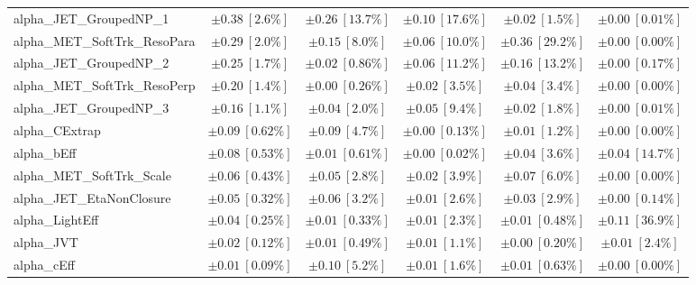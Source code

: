 \begin{sidewaystable}
\begin{center}
\begin{tabular*}{\textwidth}{@{\extracolsep{\fill}}lccccc}
alpha\_JET\_GroupedNP\_1         & $\pm 0.38\ [2.6\%] $          & $\pm 0.26\ [13.7\%] $          & $\pm 0.10\ [17.6\%] $          & $\pm 0.02\ [1.5\%] $          & $\pm 0.00\ [0.01\%] $       \\
alpha\_MET\_SoftTrk\_ResoPara         & $\pm 0.29\ [2.0\%] $          & $\pm 0.15\ [8.0\%] $          & $\pm 0.06\ [10.0\%] $          & $\pm 0.36\ [29.2\%] $          & $\pm 0.00\ [0.00\%] $       \\
alpha\_JET\_GroupedNP\_2         & $\pm 0.25\ [1.7\%] $          & $\pm 0.02\ [0.86\%] $          & $\pm 0.06\ [11.2\%] $          & $\pm 0.16\ [13.2\%] $          & $\pm 0.00\ [0.17\%] $       \\
alpha\_MET\_SoftTrk\_ResoPerp         & $\pm 0.20\ [1.4\%] $          & $\pm 0.00\ [0.26\%] $          & $\pm 0.02\ [3.5\%] $          & $\pm 0.04\ [3.4\%] $          & $\pm 0.00\ [0.00\%] $       \\
alpha\_JET\_GroupedNP\_3         & $\pm 0.16\ [1.1\%] $          & $\pm 0.04\ [2.0\%] $          & $\pm 0.05\ [9.4\%] $          & $\pm 0.02\ [1.8\%] $          & $\pm 0.00\ [0.01\%] $       \\
alpha\_CExtrap         & $\pm 0.09\ [0.62\%] $          & $\pm 0.09\ [4.7\%] $          & $\pm 0.00\ [0.13\%] $          & $\pm 0.01\ [1.2\%] $          & $\pm 0.00\ [0.00\%] $       \\
alpha\_bEff         & $\pm 0.08\ [0.53\%] $          & $\pm 0.01\ [0.61\%] $          & $\pm 0.00\ [0.02\%] $          & $\pm 0.04\ [3.6\%] $          & $\pm 0.04\ [14.7\%] $       \\
alpha\_MET\_SoftTrk\_Scale         & $\pm 0.06\ [0.43\%] $          & $\pm 0.05\ [2.8\%] $          & $\pm 0.02\ [3.9\%] $          & $\pm 0.07\ [6.0\%] $          & $\pm 0.00\ [0.00\%] $       \\
alpha\_JET\_EtaNonClosure         & $\pm 0.05\ [0.32\%] $          & $\pm 0.06\ [3.2\%] $          & $\pm 0.01\ [2.6\%] $          & $\pm 0.03\ [2.9\%] $          & $\pm 0.00\ [0.14\%] $       \\
alpha\_LightEff         & $\pm 0.04\ [0.25\%] $          & $\pm 0.01\ [0.33\%] $          & $\pm 0.01\ [2.3\%] $          & $\pm 0.01\ [0.48\%] $          & $\pm 0.11\ [36.9\%] $       \\
alpha\_JVT         & $\pm 0.02\ [0.12\%] $          & $\pm 0.01\ [0.49\%] $          & $\pm 0.01\ [1.1\%] $          & $\pm 0.00\ [0.20\%] $          & $\pm 0.01\ [2.4\%] $       \\
alpha\_cEff         & $\pm 0.01\ [0.09\%] $          & $\pm 0.10\ [5.2\%] $          & $\pm 0.01\ [1.6\%] $          & $\pm 0.01\ [0.63\%] $          & $\pm 0.00\ [0.00\%] $       \\

\end{tabular*}
\end{center}
\end{sidewaystable}
